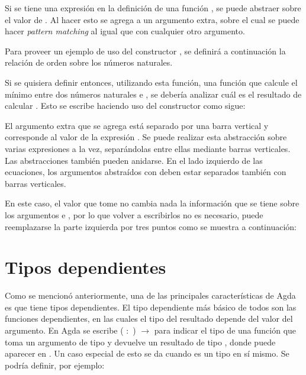 Si se tiene una expresión  en la definición de una función , se puede abstraer  sobre el valor de . Al hacer esto se agrega a  un argumento extra, sobre el cual se puede hacer \textit{pattern matching} al igual que con cualquier otro argumento. 

Para proveer un ejemplo de uso del constructor , se definirá a continuación la relación de orden \AgdaFunction{\_<\_} sobre los números naturales.


Si se quisiera definir entonces, utilizando esta función, una función  que calcule el mínimo entre dos números naturales  e , se debería analizar cuál es el resultado de calcular  \AgdaFunction{<} . Esto se escribe haciendo uso del constructor  como sigue:


El argumento extra que se agrega está separado por una barra vertical y corresponde al valor de la expresión  \AgdaFunction{<} . Se puede realizar esta abstracción sobre varias expresiones a la vez, separándolas entre ellas mediante barras verticales. Las abstracciones  también pueden anidarse. En el lado izquierdo de las ecuaciones, los argumentos abstraídos con  deben estar separados también con barras verticales. 

En este caso, el valor que tome  \AgdaFunction{<}  no cambia nada la información que se tiene sobre los argumentos  e , por lo que volver a escribirlos no es necesario, puede reemplazarse la parte izquierda por tres puntos como se muestra a continuación:


\section{Tipos dependientes}\label{agda:dependent}

Como se mencionó anteriormente, una de las principales características de Agda es que tiene tipos dependientes. El tipo dependiente más básico de todos son las funciones dependientes, en las cuales el tipo del resultado depende del valor del argumento. En Agda se escribe ( $:$ ) $\rightarrow$  para indicar el tipo de una función que toma un argumento  de tipo  y devuelve un resultado de tipo , donde  puede aparecer en . Un caso especial de esto se da cuando  es un tipo en sí mismo. Se podría definir, por ejemplo:


